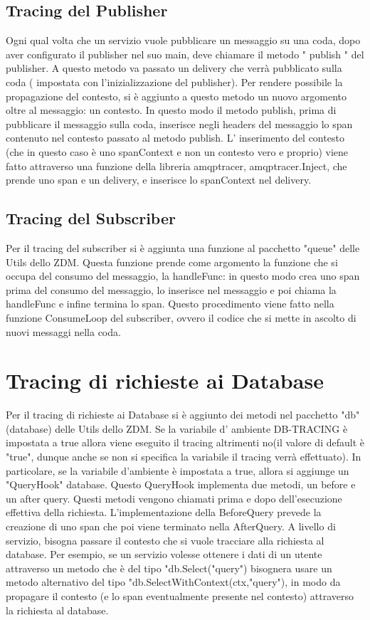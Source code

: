 \documentclass[a4paper,12pt,titlepage,italian,openany]{report}
\begin{document}
\subsection{Tracing del Publisher}
Ogni qual volta che un servizio vuole pubblicare un messaggio su una coda, dopo aver configurato il publisher nel suo main, deve chiamare il metodo " publish " del publisher. A questo metodo va passato un delivery che verrà pubblicato sulla coda ( impostata con l'inizializzazione del publisher). Per rendere possibile la propagazione del contesto, si è aggiunto a questo metodo un nuovo argomento oltre al messaggio: un contesto. In questo modo il metodo publish, prima di pubblicare il messaggio sulla coda, inserisce negli headers del messaggio lo span contenuto nel contesto passato al metodo publish.
L' inserimento del contesto (che in questo caso è uno spanContext e non un contesto vero e proprio) viene fatto attraverso una funzione della libreria amqptracer, amqptracer.Inject, che prende uno span e un delivery, e inserisce lo spanContext nel delivery.
\subsection{Tracing del Subscriber}
Per il tracing del subscriber si è aggiunta una funzione al pacchetto "queue" delle Utils dello ZDM\cite{zdm:1}. Questa funzione prende come argomento la funzione che si occupa del consumo del messaggio, la handleFunc:
in questo modo crea uno span prima del consumo del messaggio, lo inserisce nel messaggio e poi chiama la handleFunc e infine termina lo span. Questo procedimento viene fatto nella funzione ConsumeLoop del subscriber, ovvero il codice che si mette in ascolto di nuovi messaggi nella coda.
\section{Tracing di richieste ai Database}
Per il tracing di richieste ai Database si è aggiunto dei metodi nel pacchetto "db" (database) delle Utils dello ZDM\cite{zdm:1}. Se la variabile d' ambiente DB-TRACING è impostata a true allora viene eseguito il tracing altrimenti no(il valore di default è "true", dunque anche se non si specifica la variabile il tracing verrà effettuato).
In particolare, se la variabile d'ambiente è impostata a true, allora si aggiunge un "QueryHook" database. Questo QueryHook implementa due metodi, un before e  un after query. Questi metodi vengono chiamati prima e dopo dell'esecuzione effettiva della richiesta. L'implementazione della BeforeQuery prevede la creazione di uno span che poi viene terminato nella AfterQuery.
A livello di servizio, bisogna passare il contesto che si vuole tracciare alla richiesta al database. Per esempio, se un servizio volesse ottenere i dati di un utente attraverso un metodo che è del tipo "db.Select("query") bisognera usare un metodo alternativo del tipo "db.SelectWithContext(ctx,"query"), in modo da propagare il contesto (e lo span eventualmente presente nel contesto) attraverso la richiesta al database.
\end{document}
